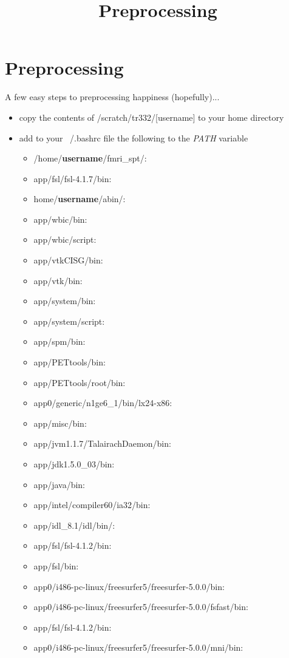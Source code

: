 \documentclass[a4paper,10pt]{article}
\title{Preprocessing}
\author{}
\begin{document}
\maketitle
\section{Preprocessing}
A few easy steps to preprocessing happiness (hopefully)...
\begin{itemize}
 \item copy the contents of /scratch/tr332/[username] to your home directory
 \item add to your ~/.bashrc file the following to the \emph{PATH} variable
 \begin{itemize}
   \item /home/\textbf{username}/fmri\_spt/:
   \item app/fsl/fsl-4.1.7/bin:
   \item home/\textbf{username}/abin/:
   \item app/wbic/bin:
   \item app/wbic/script:
   \item app/vtkCISG/bin:
   \item app/vtk/bin:
   \item app/system/bin:
   \item app/system/script:
   \item app/spm/bin:
   \item app/PETtools/bin:
   \item app/PETtools/root/bin:
   \item app0/generic/n1ge6\_1/bin/lx24-x86:
   \item app/misc/bin:
   \item app/jvm1.1.7/TalairachDaemon/bin:
   \item app/jdk1.5.0\_03/bin:
   \item app/java/bin:
   \item app/intel/compiler60/ia32/bin:
   \item app/idl\_8.1/idl/bin/:
   \item app/fsl/fsl-4.1.2/bin:
   \item app/fsl/bin:
   \item app0/i486-pc-linux/freesurfer5/freesurfer-5.0.0/bin:
   \item app0/i486-pc-linux/freesurfer5/freesurfer-5.0.0/fsfast/bin:
   \item app/fsl/fsl-4.1.2/bin:
   \item app0/i486-pc-linux/freesurfer5/freesurfer-5.0.0/mni/bin:

\end{itemize}
\end{itemize}
\end{document}

